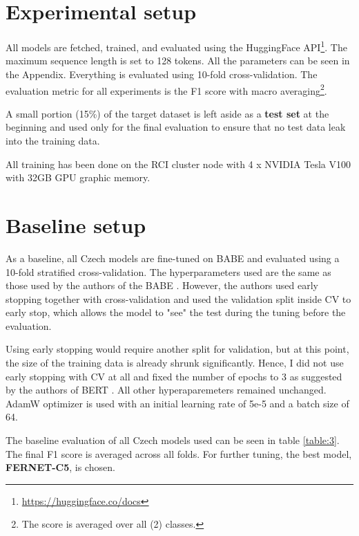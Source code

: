 \section{Experimental setup}
All models are fetched, trained, and evaluated using the HuggingFace API\footnote{\url{https://huggingface.co/docs}}. The maximum sequence length is set to 128 tokens. All the parameters can be seen in the Appendix.
Everything is evaluated using 10-fold cross-validation. The evaluation metric for all experiments is the F1 score with macro averaging\footnote{The score is averaged over all (2) classes.}. 

A small portion (15\%) of the target dataset is left aside as a \textbf{test set} at the beginning and used only for the final evaluation to ensure that no test data leak into the training data.

All training has been done on the RCI cluster node with 4 x NVIDIA Tesla V100 with 32GB GPU graphic memory.





 \section{Baseline setup}
 As a baseline, all Czech models are fine-tuned on BABE and evaluated using a 10-fold stratified cross-validation. The hyperparameters used are the same as those used by the authors of the BABE \cite{Spinde2021MBIC}. However, the authors used early stopping together with cross-validation and used the validation split inside CV to early stop, which allows the model to "see" the test during the tuning before the evaluation. 
 
 Using early stopping would require another split for validation, but at this point, the size of the training data is already shrunk significantly. Hence, I did not use early stopping with CV at all and fixed the number of epochs to 3 as suggested by the authors of BERT \cite{devlin2019bert} . 
 All other hyperaparemeters remained unchanged. AdamW optimizer is used with an initial learning rate of 5e-5 and a batch size of 64.
 
 The baseline evaluation of all Czech models used can be seen in table \ref{table:3}. The final F1 score is averaged across all folds. For further tuning, the best model, \textbf{FERNET-C5}, is chosen.
 

 
 

 
 
